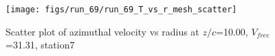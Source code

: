 \begin{figure}[H]
\centering
\texttt{[image: figs/run\_69/run\_69\_T\_vs\_r\_mesh\_scatter]}
\caption{Scatter plot of azimuthal velocity vs radius at $z/c$=10.00, $V_{free}$=31.31, station7}
\label{fig:run_69_T_vs_r_mesh_scatter}
\end{figure}


